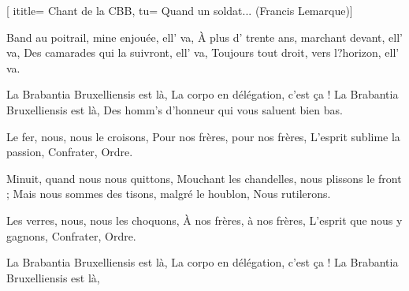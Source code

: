 [
ititle= {Chant de la CBB},
tu= {Quand un soldat... (Francis Lemarque)}]


\beginverse
Band au poitrail, mine enjouée, ell' va,
À plus d' trente ans, marchant devant, ell' va,
Des camarades qui la suivront, ell' va,
Toujours tout droit, vers l?horizon, ell' va.
\endverse

\beginchorus
La Brabantia Bruxelliensis est là,
La corpo en délégation, c'est ça !
La Brabantia Bruxelliensis est là,
Des homm's d'honneur qui vous saluent bien bas.
\endchorus

\beginverse
Le fer, nous, nous le croisons,
Pour nos frères,
pour nos frères,
L'esprit sublime la passion,
Confrater, Ordre.
\enverse

\beginverse
Minuit, quand nous nous quittons,
Mouchant les chandelles, nous plissons le front ;
Mais nous sommes des tisons, malgré le houblon,
Nous rutilerons.
\endverse

\beginverse
Les verres, nous, nous les choquons,
À nos frères, à nos frères,
L'esprit que nous y gagnons,
Confrater, Ordre.
\endverse

\beginchorus
La Brabantia Bruxelliensis est là,
La corpo en délégation, c'est ça !
La Brabantia Bruxelliensis est là,
\endchorus

\endsong